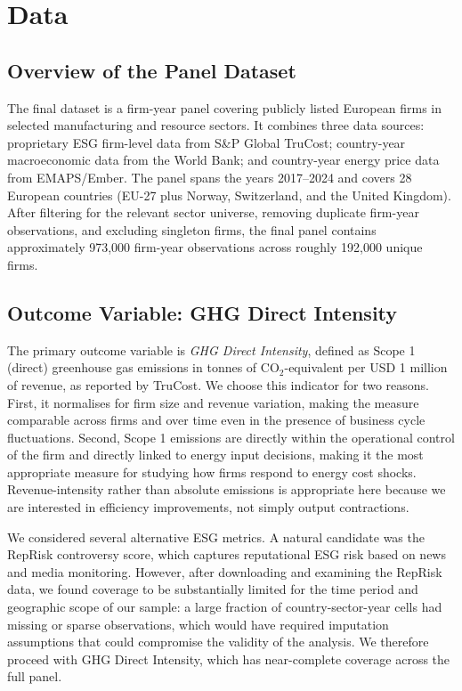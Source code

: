\documentclass[12pt,a4paper]{article}
\begin{document}
\section{Data}
\label{sec:data}

\subsection{Overview of the Panel Dataset}

The final dataset is a firm-year panel covering publicly listed European firms in selected manufacturing and resource sectors. It combines three data sources: proprietary ESG firm-level data from S\&P Global TruCost; country-year macroeconomic data from the World Bank; and country-year energy price data from EMAPS/Ember. The panel spans the years 2017–2024 and covers 28 European countries (EU-27 plus Norway, Switzerland, and the United Kingdom). After filtering for the relevant sector universe, removing duplicate firm-year observations, and excluding singleton firms, the final panel contains approximately 973,000 firm-year observations across roughly 192,000 unique firms.

\subsection{Outcome Variable: GHG Direct Intensity}

The primary outcome variable is \textit{GHG Direct Intensity}, defined as Scope 1 (direct) greenhouse gas emissions in tonnes of CO$_2$-equivalent per USD 1 million of revenue, as reported by TruCost. We choose this indicator for two reasons. First, it normalises for firm size and revenue variation, making the measure comparable across firms and over time even in the presence of business cycle fluctuations. Second, Scope 1 emissions are directly within the operational control of the firm and directly linked to energy input decisions, making it the most appropriate measure for studying how firms respond to energy cost shocks. Revenue-intensity rather than absolute emissions is appropriate here because we are interested in efficiency improvements, not simply output contractions.

We considered several alternative ESG metrics. A natural candidate was the RepRisk controversy score, which captures reputational ESG risk based on news and media monitoring. However, after downloading and examining the RepRisk data, we found coverage to be substantially limited for the time period and geographic scope of our sample: a large fraction of country-sector-year cells had missing or sparse observations, which would have required imputation assumptions that could compromise the validity of the analysis. We therefore proceed with GHG Direct Intensity, which has near-complete coverage across the full panel.
\end{document}
